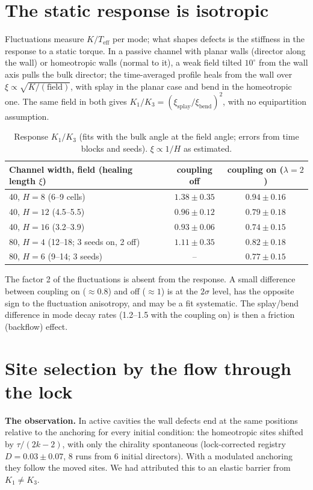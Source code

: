 \documentclass[11pt,a4paper]{article}
\begin{document}
\section{The static response is isotropic}
Fluctuations measure $K/T_\mathrm{eff}$ per mode; what shapes defects is the stiffness in the response to a static torque. In a passive channel
with planar walls (director along the wall) or homeotropic walls (normal to it), a weak field tilted $10^\circ$ from the wall axis pulls the bulk
director; the time-averaged profile heals from the wall over $\xi\propto\sqrt{K/(\text{field})}$, with splay in the planar case and bend in the
homeotropic one. The same field in both gives $K_1/K_3=(\xi_\mathrm{splay}/\xi_\mathrm{bend})^2$, with no equipartition assumption.
\begin{table}[H]\centering\small
\begin{tabular}{lcc}\toprule
Channel width, field (healing length $\xi$) & coupling off & coupling on ($\lambda=2$)\\\midrule
40, $H=8$ (6--9 cells) & $1.38\pm0.35$ & $0.94\pm0.16$\\
40, $H=12$ (4.5--5.5) & $0.96\pm0.12$ & $0.79\pm0.18$\\
40, $H=16$ (3.2--3.9) & $0.93\pm0.06$ & $0.74\pm0.15$\\
80, $H=4$ (12--18; 3 seeds on, 2 off) & $1.11\pm0.35$ & $0.82\pm0.18$\\
80, $H=6$ (9--14; 3 seeds) & -- & $0.77\pm0.15$\\\bottomrule
\end{tabular}
\caption{Response $K_1/K_3$ (fits with the bulk angle at the field angle; errors from time blocks and seeds). $\xi\propto1/H$ as estimated.}
\end{table}
The factor 2 of the fluctuations is absent from the response. A small difference between coupling on ($\approx0.8$) and off ($\approx1$) is at
the $2\sigma$ level, has the opposite sign to the fluctuation anisotropy, and may be a fit systematic. The splay/bend difference in mode decay
rates (1.2--1.5 with the coupling on) is then a friction (backflow) effect.

\section{Site selection by the flow through the lock}
\textbf{The observation.} In active cavities the wall defects end at the same positions relative to the anchoring for every initial condition:
the homeotropic sites shifted by $\tau/(2k-2)$, with only the chirality spontaneous (lock-corrected registry $D=0.03\pm0.07$, 8 runs from 6
initial directors). With a modulated anchoring they follow the moved sites. We had attributed this to an elastic barrier from $K_1\neq K_3$.
\end{document}
